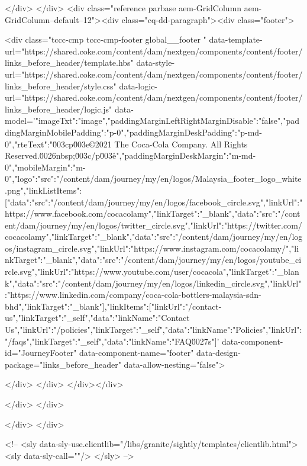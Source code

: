     
</div>
</div>
<div class="reference parbase aem-GridColumn aem-GridColumn--default--12"><div class="cq-dd-paragraph"><div class="footer">
    








<div class="tccc-cmp tccc-cmp-footer global__footer
    " data-template-url="https://shared.coke.com/content/dam/nextgen/components/content/footer/links_before_header/template.hbs" data-style-url="https://shared.coke.com/content/dam/nextgen/components/content/footer/links_before_header/style.css" data-logic-url="https://shared.coke.com/content/dam/nextgen/components/content/footer/links_before_header/logic.js" data-model='{"imageTxt":"image","paddingMarginLeftRightMarginDisable":"false","paddingMarginMobilePadding":"p-0","paddingMarginDeskPadding":"p-md-0","rteText":"\u003cp\u003e©2021 The Coca-Cola Company. All Rights Reserved.\u0026nbsp;\u003c/p\u003e\r\n","paddingMarginDeskMargin":"m-md-0","mobileMargin":"m-0","logo":{"src":"/content/dam/journey/my/en/logos/Malaysia_footer_logo_white.png"},"linkListItems":[{"data":{"src":"/content/dam/journey/my/en/logos/facebook_circle.svg","linkUrl":"https://www.facebook.com/cocacolamy","linkTarget":"_blank"}},{"data":{"src":"/content/dam/journey/my/en/logos/twitter_circle.svg","linkUrl":"https://twitter.com/cocacolamy","linkTarget":"_blank"}},{"data":{"src":"/content/dam/journey/my/en/logos/instagram_circle.svg","linkUrl":"https://www.instagram.com/cocacolamy/","linkTarget":"_blank"}},{"data":{"src":"/content/dam/journey/my/en/logos/youtube_circle.svg","linkUrl":"https://www.youtube.com/user/cocacola","linkTarget":"_blank"}},{"data":{"src":"/content/dam/journey/my/en/logos/linkedin_circle.svg","linkUrl":"https://www.linkedin.com/company/coca-cola-bottlers-malaysia-sdn-bhd","linkTarget":"_blank"}}],"linkItems":[{"linkUrl":"/contact-us","linkTarget":"_self","data":{"linkName":"Contact Us"}},{"linkUrl":"/policies","linkTarget":"_self","data":{"linkName":"Policies"}},{"linkUrl":"/faqs","linkTarget":"_self","data":{"linkName":"FAQ\u0027s"}}]}' data-component-id="JourneyFooter" data-component-name="footer" data-design-package="links_before_header" data-allow-nesting="false">
    
</div>
</div>
</div></div>

    
</div>
</div>

    
</div>
</div>

        
    
    
    <!-- <sly data-sly-use.clientlib="/libs/granite/sightly/templates/clientlib.html">
	    <sly data-sly-call=""/>
	</sly> -->
    
